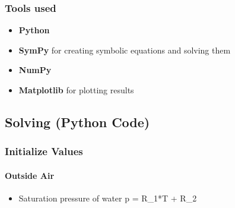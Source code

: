 \documentclass[11pt]{article}
\providecommand{\tightlist}{%
      \setlength{\itemsep}{0pt}\setlength{\parskip}{0pt}}
\begin{document}
    \hypertarget{tools-used}{%
\subsubsection{Tools used}\label{tools-used}}

\begin{itemize}
\tightlist
\item
  \textbf{Python}
\item
  \textbf{SymPy} for creating symbolic equations and solving them
\item
  \textbf{NumPy}
\item
  \textbf{Matplotlib} for plotting results
\end{itemize}

    \hypertarget{solving-python-code}{%
\subsection{Solving (Python Code)}\label{solving-python-code}}

    \hypertarget{initialize-values}{%
\subsubsection{Initialize Values}\label{initialize-values}}

    \hypertarget{outside-air}{%
\paragraph{Outside Air}\label{outside-air}}

\begin{itemize}
\tightlist
\item
  Saturation pressure of water p = R\_1*T + R\_2
\end{itemize}
\end{document}

